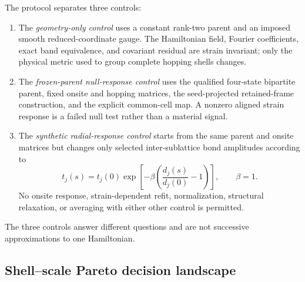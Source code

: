 \documentclass[11pt]{article}
\begin{document}
The protocol separates three controls:
\begin{enumerate}
 \item The \emph{geometry-only control} uses a constant rank-two parent and an imposed
 smooth reduced-coordinate gauge. The Hamiltonian field, Fourier coefficients, exact
 band equivalence, and covariant residual are strain invariant; only the physical metric
 used to group complete hopping shells changes.
 \item The \emph{frozen-parent null-response control} uses the qualified four-state
 bipartite parent, fixed onsite and hopping matrices, the seed-projected retained-frame
 construction, and the explicit common-cell map. A nonzero aligned strain response is a
 failed null test rather than a material signal.
 \item The \emph{synthetic radial-response control} starts from the same parent and
 onsite matrices but changes only selected inter-sublattice bond amplitudes according to
 \begin{equation}
  t_j(s)=t_j(0)\exp\!\left[-\beta
  \left(\frac{d_j(s)}{d_j(0)}-1\right)\right],
  \qquad \beta=1.
  \label{eq:strain-radial-response-law}
 \end{equation}
 No onsite response, strain-dependent refit, normalization, structural relaxation, or
 averaging with either other control is permitted.
\end{enumerate}
The three controls answer different questions and are not successive approximations to
one Hamiltonian.

\subsection{Shell--scale Pareto decision landscape}
\end{document}

